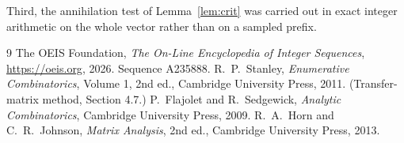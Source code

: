 \documentclass[11pt,a4paper]{article}
\theoremstyle{plain}
\theoremstyle{definition}
\begin{document}
Third, the annihilation test of Lemma~\ref{lem:crit} was carried out in exact integer
arithmetic on the whole vector rather than on a sampled prefix.

\begin{thebibliography}{9}
 The OEIS Foundation, \emph{The On-Line Encyclopedia of Integer
Sequences}, \url{https://oeis.org}, 2026. Sequence A235888.
 R.~P.~Stanley, \emph{Enumerative Combinatorics}, Volume 1, 2nd ed.,
Cambridge University Press, 2011. (Transfer-matrix method, Section 4.7.)
 P.~Flajolet and R.~Sedgewick, \emph{Analytic Combinatorics}, Cambridge
University Press, 2009.
 R.~A.~Horn and C.~R.~Johnson, \emph{Matrix Analysis}, 2nd ed., Cambridge
University Press, 2013.
\end{thebibliography}
\end{document}
